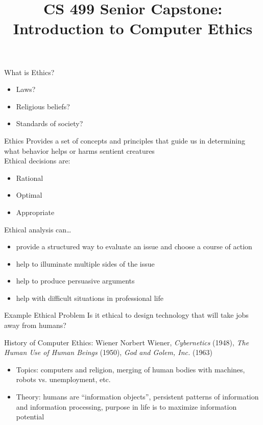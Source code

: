\documentclass{beamer}
\title[Introduction to Computer Ethics]{CS 499 Senior Capstone: \\ Introduction to Computer Ethics}
\date{}
\begin{document}
\begin{frame}
\titlepage
\end{frame}

\begin{frame}{What is Ethics?}
\begin{itemize}
\item Laws?
\bigskip
\item Religious beliefs?
\bigskip
\item Standards of society?
\end{itemize}
\end{frame}

\begin{frame}{Ethics}
Provides a set of concepts and principles that guide us in determining what behavior helps or harms sentient creatures\\
\bigskip
\bigskip
Ethical decisions are:
\begin{itemize}
\item Rational
\item Optimal
\item Appropriate
\end{itemize}
\end{frame}

\begin{frame}{Ethical analysis can\ldots}
\begin{itemize}
\item provide a structured way to evaluate an issue and choose a course of action
\bigskip
\item help to illuminate multiple sides of the issue
\bigskip
\item help to produce persuasive arguments
\bigskip
\item help with difficult situations in professional life 
\end{itemize}
\end{frame}

\begin{frame}{Example Ethical Problem}
Is it ethical to design technology that will take jobs away from humans?
\end{frame}

\begin{frame}{History of Computer Ethics: Wiener}
Norbert Wiener, \emph{Cybernetics} (1948), \emph{The Human Use of Human Beings} (1950), \emph{God and Golem, Inc.} (1963)
\begin{itemize}
\item Topics: computers and religion, merging of human bodies with machines, robots vs. unemployment, etc.
\item Theory: humans are ``information objects'', persistent patterns of information and information processing, purpose in life is to maximize information potential
\end{itemize}
\end{frame}
\end{document}
